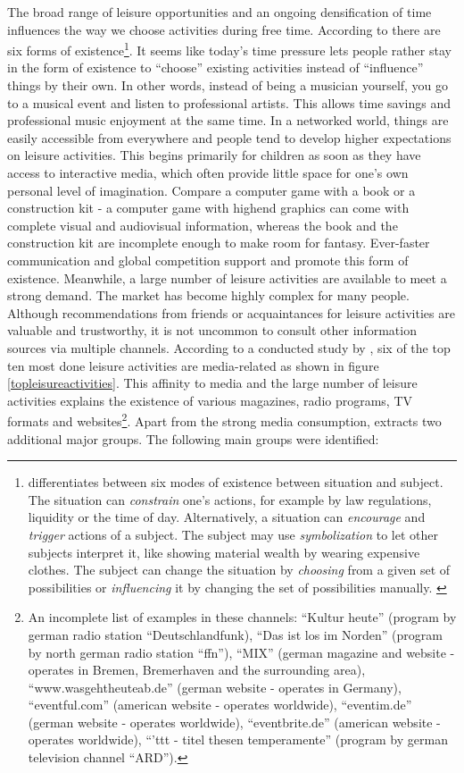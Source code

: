 \documentclass[12pt,numbers=noenddot,parskip,bibliography=totocnumbered,listof=totocnumbered,draft]{scrreprt}
\begin{document}
The broad range of leisure opportunities and an ongoing densification of time influences the way we choose activities during free time. According to \citeauthor{schulze2005} there are six forms of existence\footnote{\citeauthor{schulze2005} differentiates between six modes of existence between situation and subject. The situation can \textit{constrain} one's actions, for example by law regulations, liquidity or the time of day. Alternatively, a situation can \textit{encourage} and \textit{trigger} actions of a subject. The subject may use \textit{symbolization} to let other subjects interpret it, like showing material wealth by wearing expensive clothes. The subject can change the situation by \textit{choosing} from a given set of possibilities or \textit{influencing} it by changing the set of possibilities manually. \citep[p. 198-206]{schulze2005}}. It seems like today's time pressure lets people rather stay in the form of existence to ``choose'' existing activities instead of ``influence'' things by their own. In other words, instead of being a musician yourself, you go to a musical event and listen to professional artists. This allows time savings and professional music enjoyment at the same time. In a networked world, things are easily accessible from everywhere and people tend to develop higher expectations on leisure activities. This begins primarily for children as soon as they have access to interactive media, which often provide little space for one's own personal level of imagination. Compare a computer game with a book or a construction kit - a computer game with highend graphics can come with complete visual and audiovisual information, whereas the book and the construction kit are incomplete enough to make room for fantasy. Ever-faster communication and global competition support and promote this form of existence. Meanwhile, a large number of leisure activities are available to meet a strong demand. The market has become highly complex for many people. Although recommendations from friends or acquaintances for leisure activities are valuable and trustworthy, it is not uncommon to consult other information sources via multiple channels. According to a conducted study by \citeauthor{freizeitmonitor2016}, six of the top ten most done leisure activities are media-related as shown in figure \ref{topleisureactivities}. This affinity to media and the large number of leisure activities explains the existence of various magazines, radio programs, TV formats and websites\footnote{An incomplete list of examples in these channels: ``Kultur heute'' (program by german radio station ``Deutschlandfunk), ``Das ist los im Norden'' (program by north german radio station ``ffn''), ``MIX'' (german magazine and website - operates in Bremen, Bremerhaven and the surrounding area), ``www.wasgehtheuteab.de'' (german website - operates in Germany), ``eventful.com'' (american website - operates worldwide), ``eventim.de'' (german website - operates worldwide), ``eventbrite.de'' (american website - operates worldwide), ``'ttt - titel thesen temperamente'' (program by german television channel ``ARD'').}. Apart from the strong media consumption, \citeauthor{freizeitmonitor2016} extracts two additional major groups. The following main groups were identified:
\end{document}
